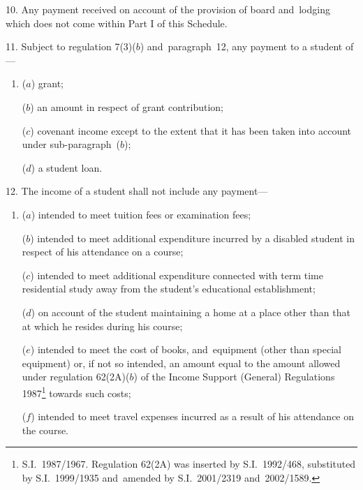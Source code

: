 \documentclass[12pt,a4paper]{article}
\begin{document}
\medskip

10.  Any payment received on account of the provision of board and~lodging which does not come within Part I of this Schedule.

\medskip

11.  Subject to regulation 7(3)($b$) and~paragraph~12, any payment to a student of—
\begin{enumerate}\item[]
($a$) grant;

($b$) an amount in respect of grant contribution;

($c$) covenant income except to the extent that it has been taken into account under sub-paragraph~($b$);

($d$) a student loan.
\end{enumerate}

\medskip

12.  The income of a student shall not include any payment—
\begin{enumerate}\item[]
($a$) intended to meet tuition fees or examination fees;

($b$) intended to meet additional expenditure incurred by a disabled student in respect of his attendance on a course;

($c$) intended to meet additional expenditure connected with term time residential study away from the student’s educational establishment;

($d$) on account of the student maintaining a home at a place other than that at which he resides during his course;

($e$) intended to meet the cost of books, and~equipment (other than special equipment) or, if not so intended, an amount equal to the amount allowed under 
regulation 62(2A)($b$)  of the Income Support (General) Regulations 1987\footnote{S.I.\ 1987/1967. Regulation 62(2A) was inserted by S.I.\ 1992/468, substituted by S.I.\ 1999/1935 and~amended by S.I.\ 2001/2319 and~2002/1589.} towards such costs;  %

($f$) intended to meet travel expenses incurred as a result of his attendance on the course.
\end{enumerate}
\end{document}
